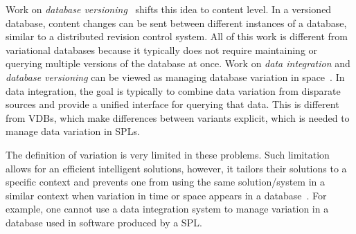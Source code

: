 %
Work on \emph{database versioning}~\cite{datasetVersioning,dbVersioning}
shifts this idea to content level. In a versioned database, 
content changes can be sent between different instances of a database,
similar to a distributed revision control system.
%
All of this work is different from variational databases because it typically
does not require maintaining or querying multiple versions of the database at
once.
%
Work on \emph{data integration} and \emph{database versioning} can be viewed as
managing database variation in space~\cite{dataIntegBook}. In data integration,
the goal is typically to combine data variation from disparate sources and
provide a unified interface for querying that data. This is different from
VDBs, which make differences between variants explicit, which is needed to
manage data variation in SPLs.

 The definition of variation is very limited in these problems. Such
 limitation allows for an efficient intelligent solutions, however, it tailors
 their solutions to a specific context and prevents one from using the same
 solution/system in a similar context when variation in time or space appears
 in a database~\cite{schVersioningSurvey95Roddick}. For example, one cannot
 use a data integration system to manage variation in a database used in
 software produced by a SPL.

